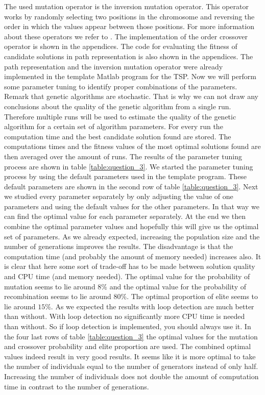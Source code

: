 The used mutation operator is the inversion mutation operator. This operator works by randomly selecting two positions in the chromosome and reversing the order in which the values appear between those positions. For more information about these operators we refer to \cite{handboek}. The implementation of the order crossover operator is shown in the appendices. The code for evaluating the fitness of candidate solutions in path representation is also shown in the appendices. The path representation and the inversion mutation operator were already implemented in the template Matlab program for the TSP.
\newline
\newline
Now we will perform some parameter tuning to identify proper combinations of the parameters. Remark that genetic algorithms are stochastic. That is why we can not draw any conclusions about the quality of the genetic algorithm from a single run. Therefore multiple runs will be used to estimate the quality of the genetic algorithm for a certain set of algorithm parameters. For every run the computation time and the best candidate solution found are stored. The computations times and the fitness values of the most optimal solutions found are then averaged over the amount of runs. The results of the parameter tuning process are shown in table \ref{table:question_3}.
\newline
\newline
We started the parameter tuning process by using the default parameters used in the template program. These default parameters are shown in the second row of table \ref{table:question_3}. Next we studied every parameter separately by only adjusting the value of one parameters and using the default values for the other parameters. In that way we can find the optimal value for each parameter separately. At the end we then combine the optimal parameter values and hopefully this will give us the optimal set of parameters. As we already expected, increasing the population size and the number of generations improves the results. The disadvantage is that the computation time (and probably the amount of memory needed) increases also. It is clear that here some sort of trade-off has to be made between solution quality and CPU time (and memory needed). The optimal value for the probability of mutation seems to lie around $8\%$ and the optimal value for the probability of recombination seems to lie around $80\%$. The optimal proportion of elite seems to lie around $15\%$. As we expected the results with loop detection are much better than without. With loop detection no significantly more CPU time is needed than without. So if loop detection is implemented, you should always use it.
\newline
\newline
In the four last rows of table \ref{table:question_3} the optimal values for the mutation and crossover probability and elite proportion are used. The combined optimal values indeed result in very good results. It seems like it is more optimal to take the number of individuals equal to the number of generators instead of only half. Increasing the number of individuals does not double the amount of computation time in contrast to the number of generations. 


